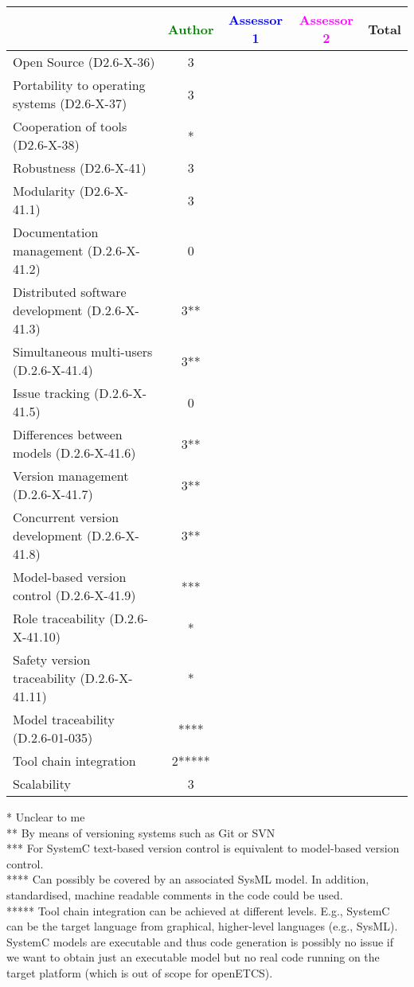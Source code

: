 \begin{tabular}{|l | c | c | c | c|}
\hline
& \textcolor{green}{Author} & \textcolor{blue}{Assessor 1} & \textcolor{magenta}{Assessor 2} & Total \\
\hline 
Open Source (D2.6-X-36) &3 & & &  \\
\hline 
Portability to operating systems (D2.6-X-37) &3 & & &  \\
\hline
Cooperation of tools (D2.6-X-38) &* & & &  \\
\hline
Robustness (D2.6-X-41) &3 & & & \\
\hline
Modularity (D2.6-X-41.1) &3 & & & \\
\hline
Documentation management (D.2.6-X-41.2) &0 & & & \\
\hline
Distributed software development (D.2.6-X-41.3)  &3** & & & \\
\hline
Simultaneous multi-users (D.2.6-X-41.4)   &3** & & & \\
\hline
Issue tracking (D.2.6-X-41.5) &0 & & & \\
\hline
Differences between models (D.2.6-X-41.6) &3** & & & \\
\hline
Version management (D.2.6-X-41.7) &3** & & & \\
\hline
Concurrent version development (D.2.6-X-41.8) &3** & & & \\
\hline
Model-based version control (D.2.6-X-41.9) &*** & & & \\
\hline
Role traceability (D.2.6-X-41.10) &* & & & \\
\hline
Safety version traceability (D.2.6-X-41.11) &* & & & \\
\hline
Model traceability (D.2.6-01-035) &**** & & & \\
\hline
Tool chain integration &2***** & & & \\
\hline
Scalability &3 & & & \\
\hline
\end{tabular}

\begin{author_comment}
  * Unclear to me\\
 ** By means of versioning systems such as Git or SVN\\
*** For SystemC text-based version control is equivalent to model-based version control.\\
**** Can possibly be covered by an associated SysML model. In addition, standardised, machine readable comments in the code could be used.\\
***** Tool chain integration can be achieved at different levels. E.g., SystemC can be the target language from graphical, higher-level languages (e.g., SysML). SystemC models are executable and thus code generation is possibly no issue if we want to obtain just an executable model but no real code running on the target platform (which is out of scope for openETCS).
\end{author_comment}


